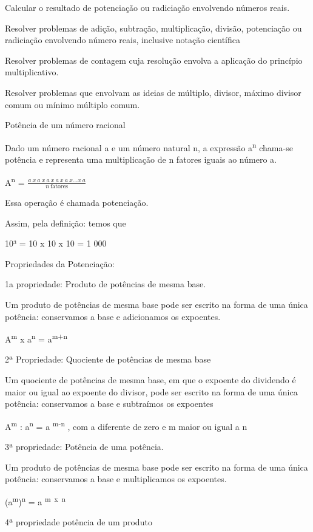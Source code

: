 {Calcular o resultado de potenciação ou radiciação envolvendo números
reais.

Resolver problemas de adição, subtração, multiplicação, divisão,
potenciação ou radiciação envolvendo número reais, inclusive notação
científica

Resolver problemas de contagem cuja resolução envolva a aplicação do
princípio multiplicativo.

Resolver problemas que envolvam as ideias de múltiplo, divisor, máximo
divisor comum ou mínimo múltiplo comum.

Potência de um número racional

Dado um número racional a e um número natural n, a expressão
a\textsuperscript{n} chama-se potência e representa uma multiplicação de
n fatores iguais ao número a.

A\textsuperscript{n} =
\(\frac{a\ x\ a\ x\ a\ x\ a\ x\ a\ x\ldots x\ a}{n\ \text{fatores}}\)

Essa operação é chamada potenciação.

Assim, pela definição: temos que

10³ = 10 x 10 x 10 = 1 000

Propriedades da Potenciação:

1a propriedade: Produto de potências de mesma base.

Um produto de potências de mesma base pode ser escrito na forma de uma
única potência: conservamos a base e adicionamos os expoentes.

A\textsuperscript{m} x a\textsuperscript{n} = a\textsuperscript{m+n}

2ª Propriedade: Quociente de potências de mesma base

Um quociente de potências de mesma base, em que o expoente do dividendo
é maior ou igual ao expoente do divisor, pode ser escrito na forma de
uma única potência: conservamos a base e subtraímos os expoentes

A\textsuperscript{m} : a\textsuperscript{n} = a \textsuperscript{m-n} ,
com a diferente de zero e m maior ou igual a n

3ª propriedade: Potência de uma potência.

Um produto de potências de mesma base pode ser escrito na forma de uma
única potência: conservamos a base e multiplicamos os expoentes.

(a\textsuperscript{m})\textsuperscript{n} = a \textsuperscript{m~x~n}

4ª propriedade potência de um produto

}
